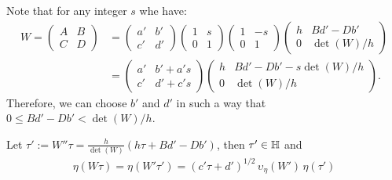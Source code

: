 \documentclass{article}
\begin{document}
Note that for any integer $s$ whe have:
\begin{align}
W = \begin{pmatrix}A&B\\C&D\end{pmatrix}
&=\begin{pmatrix}a'&b'\\c'&d'\end{pmatrix}
  \begin{pmatrix}1& s\\0&1\end{pmatrix}
  \begin{pmatrix}1&-s\\0&1\end{pmatrix}
  \begin{pmatrix}h &B d'- D b'\\0 &\det(W) / h\end{pmatrix}
  \\
&=
  \begin{pmatrix} a'&b' + a' s\\ c'&d' + c' s \end{pmatrix}
  \begin{pmatrix}
    h &B d'- D b'- s \det(W) / h\\
    0 &\det(W) / h\end{pmatrix}.
\end{align}
Therefore, we can choose $b'$ and $d'$ in such a way that
$0 \le B d'-D b' < \det(W)/h$.

Let $\tau' := W''\tau = \frac{h}{\det(W)}(h\tau + B d'- D b')$, then
$\tau'\in\mathbb{H}$ and
\begin{gather}
\eta(W\tau) =
\eta(W'\tau') =
(c'\tau+d')^{1/2}\,\upsilon_\eta(W')\,\eta(\tau')
\label{eq:eta-W-transformation}
\end{gather}
\end{document}

